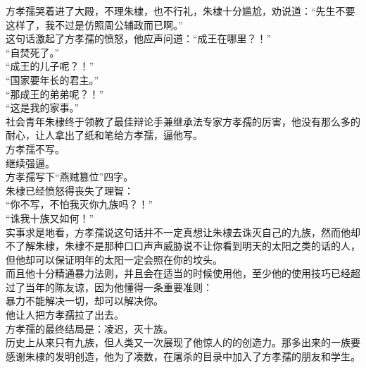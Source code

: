 \begin{multicols}{\theparacolNo}
方孝孺哭着进了大殿，不理朱棣，也不行礼，朱棣十分尴尬，劝说道：“先生不要这样了，我不过是仿照周公辅政而已啊。”\\

这句话激起了方孝孺的愤怒，他应声问道：“成王在哪里？！”\\

“自焚死了。”\\

“成王的儿子呢？！”\\

“国家要年长的君主。”\\

“那成王的弟弟呢？！”\\

“这是我的家事。”\\

社会青年朱棣终于领教了最佳辩论手兼继承法专家方孝孺的厉害，他没有那么多的耐心，让人拿出了纸和笔给方孝孺，逼他写。\\

方孝孺不写。\\

继续强逼。\\

方孝孺写下“燕贼篡位”四字。\\

朱棣已经愤怒得丧失了理智：\\

“你不写，不怕我灭你九族吗？！”\\

“诛我十族又如何！”\\

实事求是地看，方孝孺说这句话并不一定真想让朱棣去诛灭自己的九族，然而他却不了解朱棣，朱棣不是那种口口声声威胁说不让你看到明天的太阳之类的话的人，但他却可以保证明年的太阳一定会照在你的坟头。\\

而且他十分精通暴力法则，并且会在适当的时候使用他，至少他的使用技巧已经超过了当年的陈友谅，因为他懂得一条重要准则：\\

暴力不能解决一切，却可以解决你。\\

他让人把方孝孺拉了出去。\\

方孝孺的最终结局是：凌迟，灭十族。\\

历史上从来只有九族，但人类又一次展现了他惊人的的创造力。那多出来的一族要感谢朱棣的发明创造，他为了凑数，在屠杀的目录中加入了方孝孺的朋友和学生。\\


\end{multicols}
